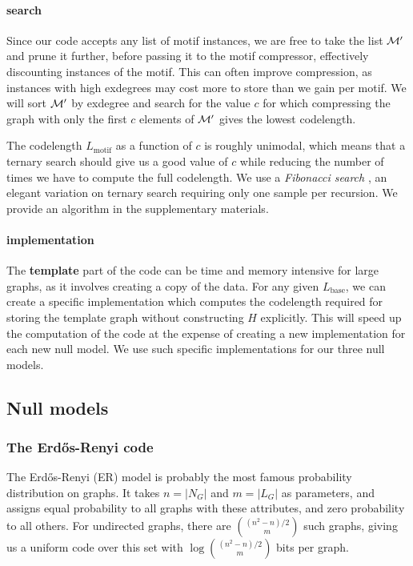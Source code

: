 \paragraph{search} Since our code accepts any list of motif instances, we are free to take the list $\cal M'$ and prune it further, before passing it to the motif compressor, effectively discounting instances of the motif. This can often improve compression, as instances with high exdegrees may cost more to store than we gain per motif. We will sort  $\cal M'$ by exdegree and search for the value $c$ for which compressing the graph with only the first $c$ elements of $\cal M'$ gives the lowest codelength.

The codelength $L_\text{motif}$ as a function of $c$ is roughly unimodal, which means that a ternary search should give us a good value of $c$ while reducing the number of times we have to compute the full codelength. We use a \emph{Fibonacci search} \cite{kiefer1953sequential}, an elegant variation on ternary search requiring only one sample per recursion. We provide an algorithm in the supplementary materials.

\paragraph{implementation} The \textbf{template} part of the code can be time and memory intensive for large graphs, as it involves creating a copy of the data. For any given $L_\text{base}$, we can create a specific implementation which computes the codelength required for storing the template graph without constructing $H$ explicitly. This will speed up the computation of the code at the expense of creating a new implementation for each new null model. We use such specific implementations for our three null models.

\subsection{Null models}

\subsubsection{The Erd\H{o}s-Renyi code}

The Erd\H{o}s-Renyi (ER) model is probably the most famous probability distribution on graphs\cite{renyi1959random,gilbert1959random}. It takes $n = |N_G|$ and $m = |L_G|$ as parameters, and assigns equal probability to all graphs with these attributes, and zero probability to all others. For undirected graphs, there are ${(n^2-n)/2 \choose m}$ such graphs, giving us a uniform code over this set with $\log{(n^2-n)/2 \choose m}$ bits per graph. 

